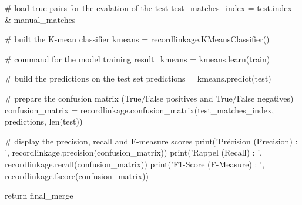 \documentclass[a4paper,12pt,twoside]{book}
\begin{document}
\begin{python}
  # load true pairs for the evalation of the test
  test_matches_index = test.index & manual_matches

  # built the K-mean classifier
  kmeans = recordlinkage.KMeansClassifier()

  # command for the model training
  result_kmeans = kmeans.learn(train)

  # build the predictions on the test set
  predictions = kmeans.predict(test)

  # prepare the confusion matrix (True/False positives and True/False negatives)
  confusion_matrix = recordlinkage.confusion_matrix(test_matches_index, predictions, len(test))

  # display the precision, recall and F-measure scores
  print('Précision (Precision) : ', recordlinkage.precision(confusion_matrix))
  print('Rappel (Recall) : ', recordlinkage.recall(confusion_matrix))
  print('F1-Score (F-Measure) : ', recordlinkage.fscore(confusion_matrix))

  return final_merge
    		    \end{python}
    		    \pagebreak
    		    
\end{document}
